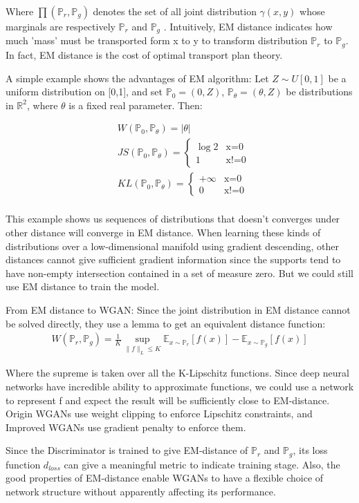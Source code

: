 Where $\prod(\mathbb{P}_r,\mathbb{P}_g)$ denotes the set of all joint distribution $\gamma(x,y)$ whose marginals are respectively $\mathbb{P}_r$ and $\mathbb{P}_g$ . Intuitively, EM distance indicates how much 'mass' must be transported form x to y to transform distribution $\mathbb{P}_r$ to $\mathbb{P}_g$. In fact, EM distance is the cost of optimal transport plan theory.

A simple example shows the advantages of EM algorithm: Let $Z \sim U[0,1]$ be a uniform distribution on [0,1], and set $\mathbb{P}_0 = (0,Z)$, $\mathbb{P}_\theta=(\theta,Z)$ be distributions in $\mathbb{R}^2$, where $\theta$ is a fixed real parameter. Then:

\begin{equation}
\begin{aligned}
&W(\mathbb{P}_0,\mathbb{P}_\theta) = |\theta|\\
&JS(\mathbb{P}_0,\mathbb{P}_\theta) = 
\begin{cases}
\log 2& \text{x=0}\\
1& \text{x!=0}
\end{cases}\\
&KL(\mathbb{P}_0,\mathbb{P}_\theta) = 
\begin{cases}
+\infty & \text{x=0}\\
0 & \text{x!=0}
\end{cases}\\
\end{aligned}
\end{equation}

This example shows us sequences of distributions that doesn't converges under other distance will converge in EM distance. When learning these kinds of distributions over a low-dimensional manifold using gradient descending, other distances cannot give sufficient gradient information since the supports tend to have non-empty intersection contained in a set of measure zero. But we could still use EM distance to train the model.

From EM distance to WGAN: Since the joint distribution in EM distance cannot be solved directly, they use a lemma to get an equivalent distance function:
\begin{equation}
\begin{aligned}
W(\mathbb{P}_r,\mathbb{P}_g) = \frac{1}{K} \sup \limits_{\|f\|_L\le K} \mathbb{E}_{x\sim\mathbb{P}_r}[f(x)]-\mathbb{E}_{x\sim\mathbb{P}_g}[f(x)]
\end{aligned}
\end{equation}

Where the supreme is taken over all the K-Lipschitz functions. Since deep neural networks have incredible ability to approximate functions, we could use a network to represent f and expect the result will be sufficiently close to EM-distance. Origin WGANs use weight clipping to enforce Lipschitz constraints, and Improved WGANs use gradient penalty to enforce them.

Since the Discriminator is trained to give EM-distance of $\mathbb{P}_r$ and $\mathbb{P}_g$, its loss function $d_{loss}$ can give a meaningful metric to indicate training stage. Also, the good properties of EM-distance enable WGANs to have a flexible choice of network structure without apparently affecting its performance.
